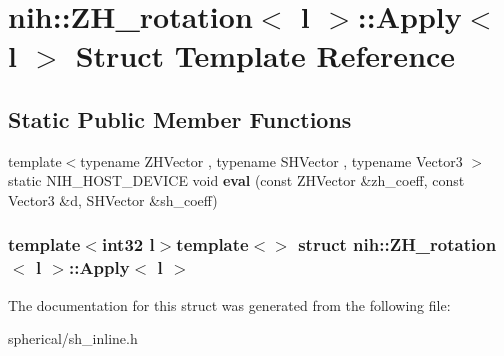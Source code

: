 \hypertarget{structnih_1_1_z_h__rotation_1_1_apply_3_01l_01_4}{
\section{nih\-:\-:\-Z\-H\-\_\-rotation$<$ l $>$\-:\-:\-Apply$<$ l $>$ \-Struct \-Template \-Reference}
\label{structnih_1_1_z_h__rotation_1_1_apply_3_01l_01_4}
}
\subsection*{\-Static \-Public \-Member \-Functions}
\begin{DoxyCompactItemize}
\item 
\hypertarget{structnih_1_1_z_h__rotation_1_1_apply_3_01l_01_4_a9ca1c3634c8256ce692a9263ac48d2a7}{
{\footnotesize template$<$typename Z\-H\-Vector , typename S\-H\-Vector , typename Vector3 $>$ }\\static \-N\-I\-H\-\_\-\-H\-O\-S\-T\-\_\-\-D\-E\-V\-I\-C\-E void {\bfseries eval} (const \-Z\-H\-Vector \&zh\-\_\-coeff, const \-Vector3 \&d, \-S\-H\-Vector \&sh\-\_\-coeff)}
\label{structnih_1_1_z_h__rotation_1_1_apply_3_01l_01_4_a9ca1c3634c8256ce692a9263ac48d2a7}

\end{DoxyCompactItemize}
\subsubsection*{template$<$int32 l$>$template$<$$>$ struct nih\-::\-Z\-H\-\_\-rotation$<$ l $>$\-::\-Apply$<$ l $>$}



\-The documentation for this struct was generated from the following file\-:\begin{DoxyCompactItemize}
\item 
spherical/sh\-\_\-inline.\-h\end{DoxyCompactItemize}
